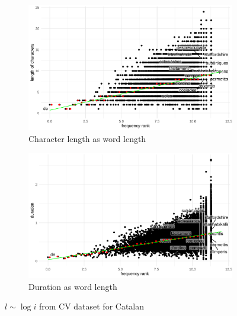 \begin{figure}[H]
  \centering
  \begin{subfigure}[b]{0.48\textwidth}
    \centering
    \includegraphics[width=\textwidth]{plots/Catalan_logi_cl_CV.pdf}
    \caption{Character length as word length}
  \end{subfigure}
  \hfill
  \begin{subfigure}[b]{0.48\textwidth}
    \centering
    \includegraphics[width=\textwidth]{plots/Catalan_logi_d_CV.pdf}
    \caption{Duration as word length}
  \end{subfigure}
  \caption{$l \sim \log i$ from CV dataset for Catalan}
\end{figure}
